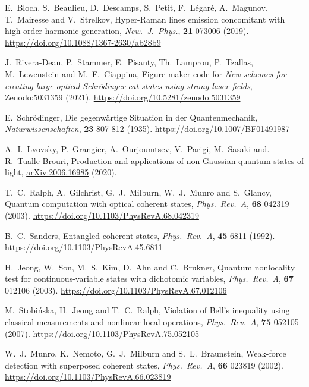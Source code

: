 \begin{thebibliography}{}
    E.\ Bloch, S.\ Beaulieu, D.\ Descamps, S.\ Petit, F.\ L\'egar\'e, A.\ Magunov, T.\ Mairesse and V.\ Strelkov, Hyper-Raman lines emission concomitant with high-order harmonic generation, \emph{New.\ J.\ Phys.}, \textbf{21} 073006 (2019). \url{https://doi.org/10.1088/1367-2630/ab28b9}

    J.\ Rivera-Dean, P.\ Stammer, E.\ Pisanty, Th.\ Lamprou, P.\ Tzallas, M.\ Lewenstein and M.\ F.\ Ciappina, Figure-maker code for \emph{New schemes for creating large optical Schrödinger cat states using strong laser fields}, Zenodo:5031359 (2021). \url{https://doi.org/10.5281/zenodo.5031359}

    E.\ Schrödinger, Die gegenwärtige Situation in der Quantenmechanik, \emph{Naturwissenschaften}, \textbf{23} 807-812 (1935). \url{https://doi.org/10.1007/BF01491987}

    A.\ I.\ Lvovsky, P.\ Grangier, A.\ Ourjoumtsev, V.\ Parigi, M.\ Sasaki and. R.\ Tualle-Brouri, Production and applications of non-Gaussian quantum states of light, \href{https://arxiv.org/abs/2006.16985}{arXiv:2006.16985} (2020).

    T.\ C.\ Ralph, A.\ Gilchrist, G.\ J.\ Milburn, W.\ J.\ Munro and S.\ Glancy, Quantum computation with optical coherent states, \emph{Phys.\ Rev.\ A}, \textbf{68} 042319 (2003). \url{https://doi.org/10.1103/PhysRevA.68.042319}
    
    B.\ C.\ Sanders, Entangled coherent states, \emph{Phys.\ Rev.\ A}, \textbf{45} 6811 (1992). \url{https://doi.org/10.1103/PhysRevA.45.6811}
    
    H.\ Jeong, W.\ Son, M.\ S.\ Kim, D.\ Ahn and \u{C}.\ Brukner, Quantum nonlocality test for continuous-variable states with dichotomic variables, \emph{Phys.\ Rev.\ A}, \textbf{67} 012106 (2003). \url{https://doi.org/10.1103/PhysRevA.67.012106}

    M.\ Stobi\'{n}ska, H.\ Jeong and T.\ C.\ Ralph, Violation of Bell's inequality using classical measurements and nonlinear local operations, \emph{Phys.\ Rev.\ A}, \textbf{75} 052105 (2007). \url{https://doi.org/10.1103/PhysRevA.75.052105}
    
    W.\ J.\ Munro, K.\ Nemoto, G.\ J.\ Milburn and S.\ L.\ Braunstein, Weak-force detection with superposed coherent states, \emph{Phys.\ Rev.\ A}, \textbf{66} 023819 (2002). \url{https://doi.org/10.1103/PhysRevA.66.023819}


\end{thebibliography}

